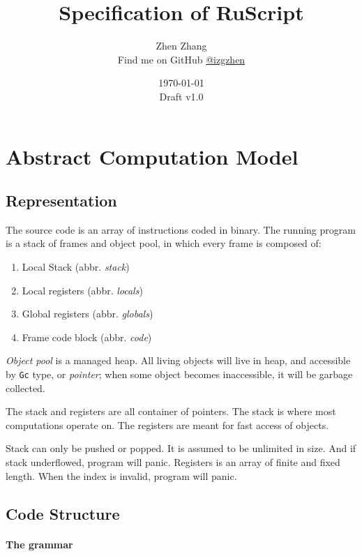 \documentclass[]{article}
\title{Specification of RuScript}
\date{\today \\ Draft v1.0}
\author{Zhen Zhang \\ Find me on GitHub \href{https://github.com/izgzhen}{@izgzhen}}
\numberwithin{equation}{section}
\numberwithin{figure}{section}
\numberwithin{table}{section}
\begin{document}
\maketitle

\newpage

\tableofcontents

\newpage

\section{Abstract Computation Model}\label{abstract-computation-model}

\subsection{Representation}\label{representation}

The source code is an array of instructions coded in binary. The running
program is a stack of frames and object pool, in which every frame is
composed of:

\begin{enumerate}
\def\labelenumi{\arabic{enumi}.}
\itemsep1pt\parskip0pt
\item
  Local Stack (abbr. \emph{stack})
\item
  Local registers (abbr. \emph{locals})
\item
  Global registers (abbr. \emph{globals})
\item
  Frame code block (abbr. \emph{code})
\end{enumerate}

\emph{Object pool} is a managed heap. All living objects will live in
heap, and accessible by \texttt{Gc} type, or \emph{pointer}; when some
object becomes inaccessible, it will be garbage collected.

The stack and registers are all container of pointers. The stack is
where most computations operate on. The registers are meant for fast access of objects.

Stack can only be pushed or popped. It is assumed to
be unlimited in size. And if stack underflowed, program will
panic. Registers is an array of finite and fixed length. When the index is
invalid, program will panic.

\subsection{Code Structure}\label{code-structure}

\paragraph{The grammar}\label{the-grammar}
\end{document}
